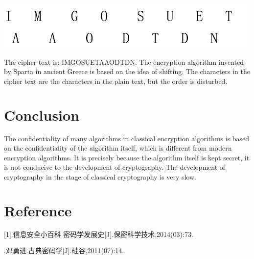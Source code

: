 \documentclass{article}
\begin{document}
\begin{center}
\includegraphics{2.jpg}
\end{center}

The cipher text is: IMGOSUETAAODTDN. The encryption algorithm invented by Sparta in ancient Greece is based on the idea of ​​shifting. The characters in the cipher text are the characters in the plain text, but the order is disturbed.\\


\section{Conclusion}


The confidentiality of many algorithms in classical encryption algorithms is based on the confidentiality of the algorithm itself, which is different from modern encryption algorithms. It is precisely because the algorithm itself is kept secret, it is not conducive to the development of cryptography. The development of cryptography in the stage of classical cryptography is very slow.


\section{Reference}


[1].信息安全小百科  密码学发展史[J].保密科学技术,2014(03):73.\par
[2].邓勇进.古典密码学[J].硅谷,2011(07):14.
\end{document}
